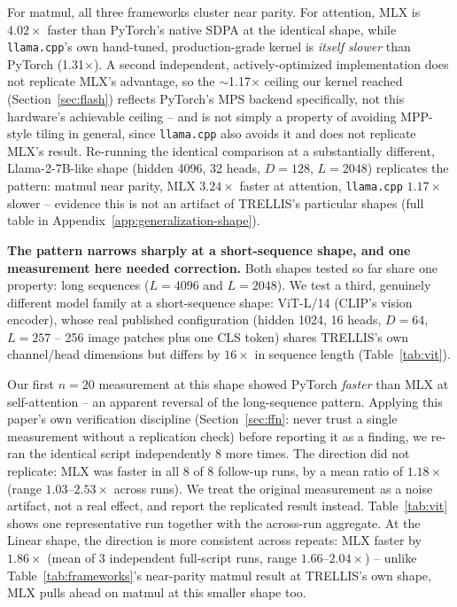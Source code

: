 \documentclass{article}
\newcommand{\code}[1]{\texttt{#1}}
\begin{document}
For matmul, all three frameworks cluster near parity. For attention, MLX is $4.02\times$ faster
than PyTorch's native SDPA at the identical shape, while \code{llama.cpp}'s own hand-tuned,
production-grade kernel is \emph{itself slower} than PyTorch (1.31$\times$). A second independent,
actively-optimized implementation does not replicate MLX's advantage, so the $\sim$1.17$\times$
ceiling our kernel reached (Section~\ref{sec:flash}) reflects PyTorch's MPS backend specifically,
not this hardware's achievable ceiling -- and is not simply a property of avoiding MPP-style tiling
in general, since \code{llama.cpp} also avoids it and does not replicate MLX's result. Re-running
the identical comparison at a substantially different, Llama-2-7B-like shape (hidden 4096, 32
heads, $D{=}128$, $L{=}2048$) replicates the pattern: matmul near parity, MLX $3.24\times$ faster at
attention, \code{llama.cpp} $1.17\times$ slower -- evidence this is not an artifact of TRELLIS's
particular shapes (full table in Appendix~\ref{app:generalization-shape}).

\textbf{The pattern narrows sharply at a short-sequence shape, and one measurement here needed
correction.} Both shapes tested so far share one property: long sequences ($L{=}4096$ and
$L{=}2048$). We test a third, genuinely different model family at a short-sequence shape:
ViT-L/14 (CLIP's vision encoder), whose real published configuration (hidden 1024, 16 heads,
$D{=}64$, $L{=}257$ -- 256 image patches plus one CLS token) shares TRELLIS's own channel/head
dimensions but differs by $16\times$ in sequence length (Table~\ref{tab:vit}).

Our first $n{=}20$ measurement at this shape showed PyTorch \emph{faster} than MLX at
self-attention -- an apparent reversal of the long-sequence pattern. Applying this paper's own
verification discipline (Section~\ref{sec:ffn}: never trust a single measurement without a
replication check) before reporting it as a finding, we re-ran the identical script independently
8 more times. The direction did not replicate: MLX was faster in all 8 of 8 follow-up runs, by a
mean ratio of $1.18\times$ (range $1.03$--$2.53\times$ across runs). We treat the original
measurement as a noise artifact, not a real effect, and report the replicated result instead.
Table~\ref{tab:vit} shows one representative run together with the across-run aggregate. At the
Linear shape, the direction is more consistent across repeats: MLX faster by $1.86\times$
(mean of 3 independent full-script runs, range $1.66$--$2.04\times$) -- unlike
Table~\ref{tab:frameworks}'s near-parity matmul result at TRELLIS's own shape, MLX pulls ahead on
matmul at this smaller shape too.
\end{document}
